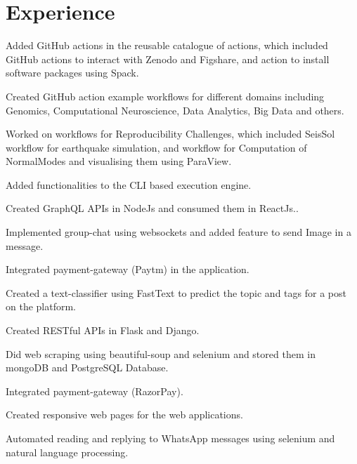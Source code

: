 \documentclass[]{deedy-resume-openfont}
\begin{document}
\begin{minipage}[t]{0.66\textwidth} 


\section{Experience}

\vspace{\topsep} %
\begin{tightemize}\item Added GitHub actions in the reusable catalogue of actions, which included GitHub actions to interact with Zenodo and Figshare, and action to install software packages using Spack.\item Created GitHub action example workflows for different domains including Genomics, Computational Neuroscience, Data Analytics, Big Data and others.\item Worked on workflows for Reproducibility Challenges, which included SeisSol workflow for earthquake simulation, and workflow for Computation of NormalModes and visualising them using ParaView.\item Added functionalities to the CLI based execution engine.
\end{tightemize}
\sectionsep

\begin{tightemize}
\item Created GraphQL APIs in NodeJs and consumed them in ReactJs..\item Implemented group-chat using websockets and added feature to send Image in a message.\item Integrated payment-gateway (Paytm) in the application.\item Created a text-classifier using FastText to predict the topic and tags for a post on the platform.\end{tightemize}
\sectionsep

\begin{tightemize}
\item Created RESTful APIs in Flask and Django.\item Did web scraping using beautiful-soup and selenium and stored them in mongoDB and PostgreSQL Database.\item Integrated payment-gateway (RazorPay).\item Created responsive web pages for the web applications. \item Automated reading and replying to WhatsApp messages using selenium and natural language processing. \end{tightemize}
\sectionsep


\end{minipage}
\end{document}
